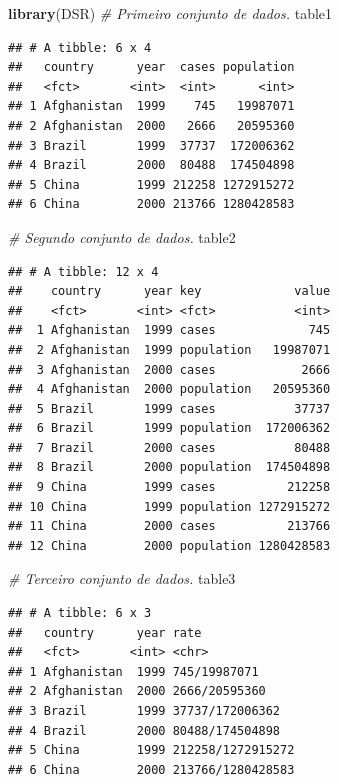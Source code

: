 \documentclass[]{book}
\newenvironment{Shaded}{\begin{snugshade}}{\end{snugshade}}
\newcommand{\CommentTok}[1]{\textcolor[rgb]{0.56,0.35,0.01}{\textit{#1}}}
\newcommand{\KeywordTok}[1]{\textcolor[rgb]{0.13,0.29,0.53}{\textbf{#1}}}
\newcommand{\NormalTok}[1]{#1}
\begin{document}
\begin{Shaded}
\begin{Highlighting}[]
\KeywordTok{library}\NormalTok{(DSR)}
\CommentTok{# Primeiro conjunto de dados.}
\NormalTok{table1}
\end{Highlighting}
\end{Shaded}

\begin{verbatim}
## # A tibble: 6 x 4
##   country      year  cases population
##   <fct>       <int>  <int>      <int>
## 1 Afghanistan  1999    745   19987071
## 2 Afghanistan  2000   2666   20595360
## 3 Brazil       1999  37737  172006362
## 4 Brazil       2000  80488  174504898
## 5 China        1999 212258 1272915272
## 6 China        2000 213766 1280428583
\end{verbatim}

\begin{Shaded}
\begin{Highlighting}[]
\CommentTok{# Segundo conjunto de dados.}
\NormalTok{table2}
\end{Highlighting}
\end{Shaded}

\begin{verbatim}
## # A tibble: 12 x 4
##    country      year key             value
##    <fct>       <int> <fct>           <int>
##  1 Afghanistan  1999 cases             745
##  2 Afghanistan  1999 population   19987071
##  3 Afghanistan  2000 cases            2666
##  4 Afghanistan  2000 population   20595360
##  5 Brazil       1999 cases           37737
##  6 Brazil       1999 population  172006362
##  7 Brazil       2000 cases           80488
##  8 Brazil       2000 population  174504898
##  9 China        1999 cases          212258
## 10 China        1999 population 1272915272
## 11 China        2000 cases          213766
## 12 China        2000 population 1280428583
\end{verbatim}

\begin{Shaded}
\begin{Highlighting}[]
\CommentTok{# Terceiro conjunto de dados.}
\NormalTok{table3}
\end{Highlighting}
\end{Shaded}

\begin{verbatim}
## # A tibble: 6 x 3
##   country      year rate             
##   <fct>       <int> <chr>            
## 1 Afghanistan  1999 745/19987071     
## 2 Afghanistan  2000 2666/20595360    
## 3 Brazil       1999 37737/172006362  
## 4 Brazil       2000 80488/174504898  
## 5 China        1999 212258/1272915272
## 6 China        2000 213766/1280428583
\end{verbatim}
\end{document}
